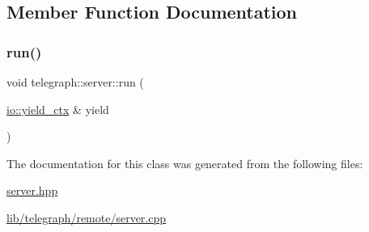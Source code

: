 \subsection{Member Function Documentation}
\mbox{\label{classtelegraph_1_1server_ad7bf15056564c266ea630e35157758bc}} 
\subsubsection{\texorpdfstring{run()}{run()}}
{\footnotesize\ttfamily void telegraph\+::server\+::run (\begin{DoxyParamCaption}\item[{\hyperlink{structboost_1_1asio_1_1yield__ctx}{io\+::yield\+\_\+ctx} \&}]{yield }\end{DoxyParamCaption})}



The documentation for this class was generated from the following files\+:\begin{DoxyCompactItemize}
\item 
\hyperlink{server_8hpp}{server.\+hpp}\item 
\hyperlink{lib_2telegraph_2remote_2server_8cpp}{lib/telegraph/remote/server.\+cpp}\end{DoxyCompactItemize}
